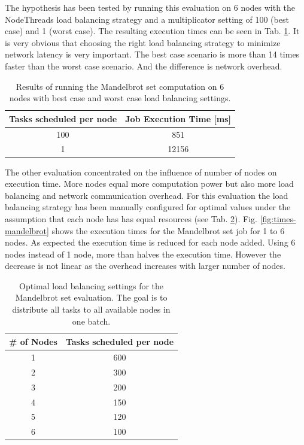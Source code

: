 \documentclass[english]{uzhpub}
\begin{document}
The hypothesis has been tested by running this evaluation on 6 nodes with the NodeThreads load balancing strategy and a multiplicator setting of 100 (best case) and 1 (worst case). The resulting execution times can be seen in Tab. \ref{tab:mandelbrot-lb-res}. It is very obvious that choosing the right load balancing strategy to minimize network latency is very important. The best case scenario is more than 14 times faster than the worst case scenario. And the difference is network overhead.

\begin{table}[h!]
\centering
\begin{tabular}{|c|c|}
\hline
\textbf{Tasks scheduled per node} & \textbf{Job Execution Time [ms]} \\ \hline
100 & 851 \\ \hline
1 & 12156 \\ \hline
\end{tabular}
\caption{Results of running the Mandelbrot set computation on 6 nodes with best case and worst case load balancing settings.}
\label{tab:mandelbrot-lb-res}
\end{table}

The other evaluation concentrated on the influence of number of nodes on execution time. More nodes equal more computation power but also more load balancing and network communication overhead. For this evaluation the load balancing strategy has been manually configured for optimal values under the assumption that each node has has equal resources (see Tab. \ref{tab:mandelbrot-lb}). Fig. \ref{fig:times-mandelbrot} shows the execution times for the Mandelbrot set job for 1 to 6 nodes. As expected the execution time is reduced for each node added. Using 6 nodes instead of 1 node, more than halves the execution time. However the decrease is not linear as the overhead increases with larger number of nodes.

\begin{table}[h!]
\centering
\begin{tabular}{|c|c|}
\hline
\textbf{\# of Nodes} & \textbf{Tasks scheduled per node} \\ \hline
1 & 600 \\ \hline
2 & 300 \\ \hline
3 & 200 \\ \hline
4 & 150 \\ \hline
5 & 120 \\ \hline
6 & 100 \\ \hline
\end{tabular}
\caption{Optimal load balancing settings for the Mandelbrot set evaluation. The goal is to distribute all tasks to all available nodes in one batch.}
\label{tab:mandelbrot-lb}
\end{table}
\end{document}
